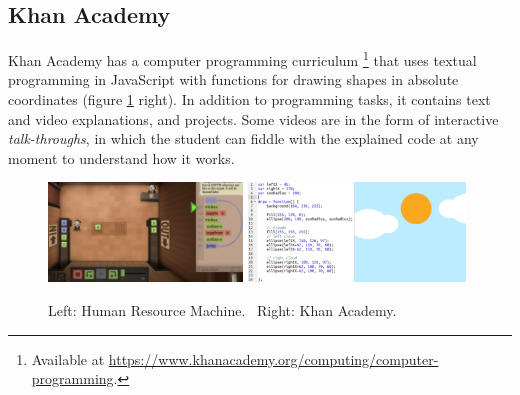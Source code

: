 
\subsection{Khan Academy}
\label{sec:khan-academy}
Khan Academy has a computer programming curriculum%
\footnote{Available at \url{https://www.khanacademy.org/computing/computer-programming}.}
that uses textual programming in JavaScript with functions for drawing shapes
in absolute coordinates %
(figure \ref{fig:hrm-ka} right).
In addition to programming tasks, it contains text and video explanations, and
projects. Some videos are in the form of interactive \emph{talk-throughs},
in which the student can fiddle with the explained code at any moment to understand
how it works.


\begin{figure}[htb]
\centering
\includegraphics[width=0.46\textwidth]{img/human-resource-machine}
\includegraphics[width=0.515\textwidth]{img/khan-academy}
\caption{%
  Left: Human Resource Machine.\protect\footnotemark~%
  Right: Khan Academy.}
\label{fig:hrm-ka}
\end{figure}

%


